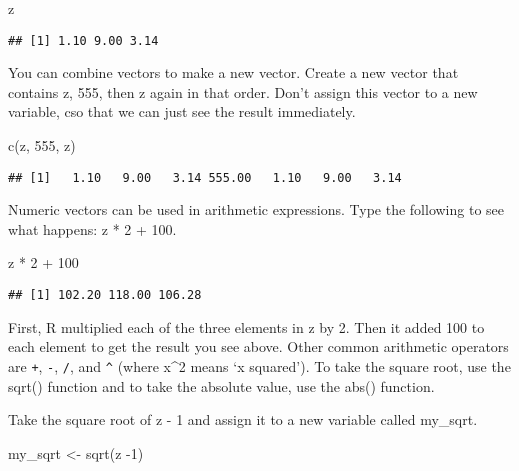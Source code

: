 \documentclass[
]{article}
\newenvironment{Shaded}{\begin{snugshade}}{\end{snugshade}}
\newcommand{\DecValTok}[1]{\textcolor[rgb]{0.00,0.00,0.81}{#1}}
\newcommand{\FunctionTok}[1]{\textcolor[rgb]{0.00,0.00,0.00}{#1}}
\newcommand{\NormalTok}[1]{#1}
\newcommand{\OtherTok}[1]{\textcolor[rgb]{0.56,0.35,0.01}{#1}}
\newcommand{\SpecialCharTok}[1]{\textcolor[rgb]{0.00,0.00,0.00}{#1}}
\begin{document}
\begin{Shaded}
\begin{Highlighting}[]
\NormalTok{z}
\end{Highlighting}
\end{Shaded}

\begin{verbatim}
## [1] 1.10 9.00 3.14
\end{verbatim}

You can combine vectors to make a new vector. Create a new vector that
contains z, 555, then z again in that order. Don't assign this vector to
a new variable, cso that we can just see the result immediately.

\begin{Shaded}
\begin{Highlighting}[]
\FunctionTok{c}\NormalTok{(z, }\DecValTok{555}\NormalTok{, z)}
\end{Highlighting}
\end{Shaded}

\begin{verbatim}
## [1]   1.10   9.00   3.14 555.00   1.10   9.00   3.14
\end{verbatim}

Numeric vectors can be used in arithmetic expressions. Type the
following to see what happens: z * 2 + 100.

\begin{Shaded}
\begin{Highlighting}[]
\NormalTok{z }\SpecialCharTok{*} \DecValTok{2} \SpecialCharTok{+} \DecValTok{100}
\end{Highlighting}
\end{Shaded}

\begin{verbatim}
## [1] 102.20 118.00 106.28
\end{verbatim}

First, R multiplied each of the three elements in z by 2. Then it added
100 to each element to get the result you see above. Other common
arithmetic operators are \texttt{+}, \texttt{-}, \texttt{/}, and
\texttt{\^{}} (where x\^{}2 means `x squared'). To take the square root,
use the sqrt() function and to take the absolute value, use the abs()
function.

Take the square root of z - 1 and assign it to a new variable called
my\_sqrt.

\begin{Shaded}
\begin{Highlighting}[]
\NormalTok{my\_sqrt }\OtherTok{\textless{}{-}} \FunctionTok{sqrt}\NormalTok{(z }\SpecialCharTok{{-}}\DecValTok{1}\NormalTok{)}
\end{Highlighting}
\end{Shaded}
\end{document}
